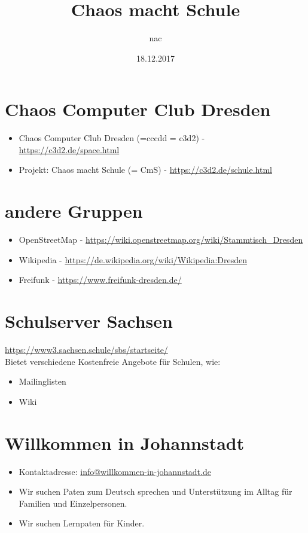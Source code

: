 \documentclass[11pt,a4paper]{article}
\author{nac}
\title{Chaos macht Schule}
\date{18.12.2017}
\begin{document}
\maketitle

\section{Chaos Computer Club Dresden}
\begin{itemize}
	\item Chaos Computer Club Dresden (=cccdd = c3d2) - \url{https://c3d2.de/space.html}
	\item Projekt: Chaos macht Schule (= CmS) - \url{https://c3d2.de/schule.html}
\end{itemize}

\section{andere Gruppen}
\begin{itemize}
	\item OpenStreetMap - \url{https://wiki.openstreetmap.org/wiki/Stammtisch_Dresden}
	\item Wikipedia - \url{https://de.wikipedia.org/wiki/Wikipedia:Dresden}
	\item Freifunk - \url{https://www.freifunk-dresden.de/}
\end{itemize}

\section{Schulserver Sachsen}
\url{https://www3.sachsen.schule/sbs/startseite/} \\
Bietet verschiedene Kostenfreie Angebote für Schulen, wie: 
\begin{itemize}
	\item Mailinglisten
	\item Wiki 
\end{itemize}

\section{Willkommen in Johannstadt}
\begin{itemize}
	\item Kontaktadresse: \href{mailto:info@willkommen-in-johannstadt.de}{info@willkommen-in-johannstadt.de}
	\item Wir suchen Paten zum Deutsch sprechen und Unterstützung im Alltag für Familien und Einzelpersonen.
	\item Wir suchen Lernpaten für Kinder.
\end{itemize}
\end{document}
